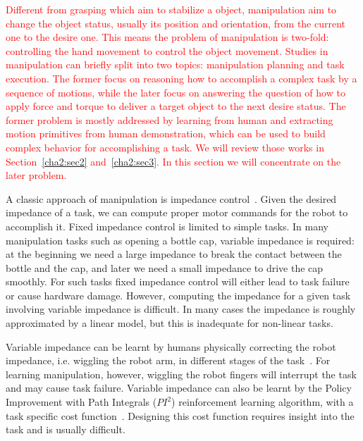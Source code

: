 \textcolor{red}{
Different from grasping which aim to stabilize a object, manipulation aim to change the object status, usually its position and orientation, from the current one to the desire one. This means the problem of manipulation is two-fold: controlling the hand movement to control the object movement. Studies in manipulation can briefly split into two topics: manipulation planning and task execution. The former focus on reasoning how to accomplish a complex task by a sequence of motions, while the later focus on answering the question of how to apply force and torque to deliver a target object to the next desire status. The former problem is mostly addressed by learning from human and extracting motion primitives from human demonstration, which can be used to build complex behavior for accomplishing a task. We will review those works in Section~\ref{cha2:sec2} and~\ref{cha2:sec3}. In this section we will concentrate on the later problem.}



A classic approach of manipulation is impedance control~\citep{howard2010transferring,wimbock2012comparison}. Given the desired impedance of a task, we can compute proper motor commands for the robot to accomplish it. Fixed impedance control is limited to simple tasks. In many manipulation tasks such as opening a bottle cap, variable impedance is required: at the beginning we need a large impedance to break the contact between the bottle and the cap, and later we need a small impedance to drive the cap smoothly. For such tasks fixed impedance control will either lead to task failure or cause hardware damage.
However, computing the impedance for a given task involving variable impedance is difficult.
In many cases the impedance is roughly approximated by a linear model, but this is inadequate for non-linear tasks.

Variable impedance can be learnt by humans physically correcting the robot impedance, i.e. wiggling the robot arm, in different stages of the task~\citep{kronander2012online}. For learning manipulation, however, wiggling the robot fingers will interrupt the task and may cause task failure.
Variable impedance can also be learnt by the Policy Improvement with Path Integrals ($PI^2$) reinforcement learning algorithm, with a task specific cost function~\citep{buchli2011learning}. Designing this cost function requires insight into the task and is usually difficult.


